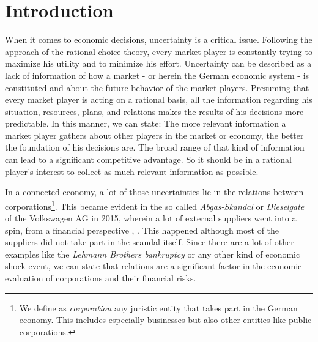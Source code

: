 \section*{Introduction}
\label{sec:Introduction}
When it comes to economic decisions, uncertainty is a critical issue. Following the approach of the rational choice theory, every market player is constantly trying to maximize his utility and to minimize his effort. Uncertainty can be described as a lack of information of how a market - or herein the German economic system - is constituted and about the future behavior of the market players. Presuming that every market player is acting on a rational basis, all the information regarding his situation, resources, plans, and relations makes the results of his decisions more predictable. In this manner, we can state: The more relevant information a market player gathers about other players in the market or economy, the better the foundation of his decisions are. The broad range of that kind of information can lead to a significant competitive advantage. So it should be in a rational player's interest to collect as much relevant information as possible.\par
In a connected economy, a lot of those uncertainties lie in the relations between corporations\footnote{We define as \emph{corporation} any juristic entity that takes part in the German economy. This includes especially businesses but also other entities like public corporations.}. This became evident in the so called \emph{Abgas-Skandal} or \emph{Dieselgate} of the Volkswagen AG in 2015, wherein a lot of external suppliers went into a spin, from a financial perspective \cite{stuttzeit}, \cite{automobilwoche}. This happened although most of the suppliers did not take part in the scandal itself. Since there are a lot of other examples like the \emph{Lehmann Brothers bankruptcy} or any other kind of economic shock event, we can state that relations are a significant factor in the economic evaluation of corporations and their financial risks.\par

